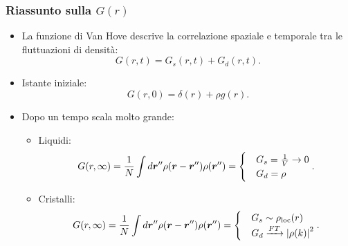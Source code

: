 \subsubsection{Riassunto sulla $G(r)$}
\label{subsubsec:Riassunto sulla $G(r)$}
\begin{itemize}
	\item La funzione di Van Hove descrive la correlazione spaziale e temporale tra
		le fluttuazioni di densità:
		\[
			G(r,t) = G_s(r,t) + G_d(r,t)
		.\] 
	\item Istante iniziale: 
	\[
		G(r,0) = \delta(r) + \rho g(r)
	.\] 
	\item Dopo un tempo scala molto grande: 
		\begin{itemize}
			\item Liquidi:
			\[
				G(r,\infty) = \frac{1}{N} \int d\boldsymbol{r}''
				\rho (\boldsymbol{r}-\boldsymbol{r}'')\rho (\boldsymbol{r}'')
				=
				\begin{cases}
					&G_s = \frac{1}{V}\to 0\\
					&G_d = \rho 
				\end{cases}
			.\] 
			\item Cristalli:
			\[
				G(r,\infty)=\frac{1}{N}\int d\boldsymbol{r}'' 
				\rho (\boldsymbol{r}-\boldsymbol{r}'')\rho (\boldsymbol{r}'') 
				=
				\begin{cases}
					&G_s \sim \rho _\text{loc} (r)\\
					&G_d \xrightarrow{FT}\left| \rho (k) \right| ^2
				\end{cases}
			.\] 
		\end{itemize}
\end{itemize}
